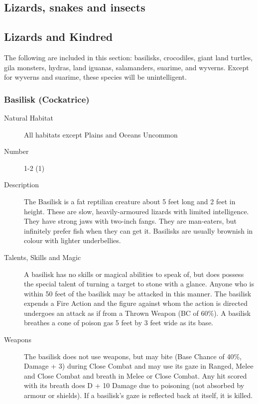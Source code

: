 \begin{multicols}{2}

\setlength\columnseprule{0.2mm}

\section{Lizards, snakes and insects}

\subsection{Lizards and Kindred}
The following are included in this section: basilisks, crocodiles,
giant land turtles, gila monsters, hydras, land iguanas, salamanders,
suarime, and wyverns.  Except for wyverns and suarime, these species
will be unintelligent.

\subsubsection{Basilisk (Cockatrice)}

\begin{description}
\item[Natural Habitat] All habitats except Plains and Oceans Uncommon

\item[Number] 1-2 (1)

\item[Description] The Basilisk is a fat reptilian creature about 5 feet
long and 2 feet in height. These are slow, heavily-armoured lizards
with limited intelligence.  They have strong jaws with two-inch
fangs.  They are man-eaters, but infinitely prefer fish when they can
get it.  Basilisks are usually brownish in colour with lighter
underbellies.

\item[Talents, Skills and Magic] A basilisk has no skills or magical abilities to speak of,
but does possess the special talent of turning a target to stone with
a glance.  Anyone who is within 50 feet of the basilisk may be
attacked in this manner.  The basilisk expends a Fire Action and the
figure against whom the action is directed undergoes an attack as if
from a Thrown Weapon (BC of 60\%). A basilisk breathes a cone of
poison gas 5 feet by 3 feet wide as its base.

\item[Weapons] The basilisk does not use weapons, but may bite (Base Chance
of 40\%, Damage + 3) during Close Combat and may use its gaze in
Ranged, Melee and Close Combat and breath in Melee or Close Combat.
Any hit scored with its breath does D + 10 Damage due to poisoning
(not absorbed by armour or shields). If a basilisk's gaze is reflected
back at itself, it is killed.


\end{description}
\end{multicols}
